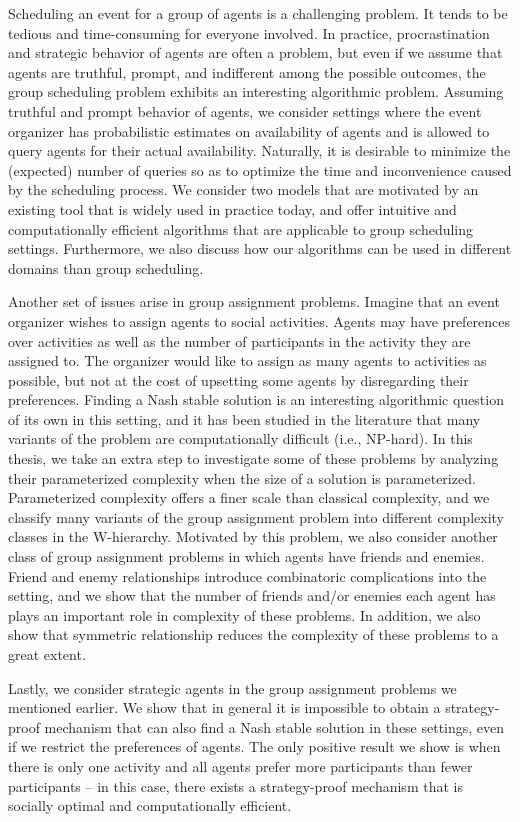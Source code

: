 Scheduling an event for a group of agents is a challenging problem. 
It tends to be tedious and time-consuming for everyone involved. 
In practice, procrastination and strategic behavior of agents are often a problem, but even if we assume that agents are truthful, prompt, and indifferent among the possible outcomes, the group scheduling problem exhibits an interesting algorithmic problem. Assuming truthful and prompt behavior of agents, we consider settings where the event organizer has probabilistic estimates on availability of agents and is allowed to query agents for their actual availability. Naturally, it is desirable to minimize the (expected) number of queries so as to optimize the time and inconvenience caused by the scheduling process. We consider two models that are motivated by an existing tool that is widely used in practice today, and offer intuitive and computationally efficient algorithms that are applicable to group scheduling settings. Furthermore, we also discuss how our algorithms can be used in different domains than group scheduling. 

Another set of issues arise in group assignment problems. Imagine that an event organizer wishes to assign agents to social activities. Agents may have preferences over activities as well as the number of participants in the activity they are assigned to. The organizer would like to assign as many agents to activities as possible, but not at the cost of upsetting some agents by disregarding their preferences. Finding a Nash stable solution is an interesting algorithmic question of its own in this setting, and it has been studied in the literature that many variants of the problem are computationally difficult (i.e., NP-hard). In this thesis, we take an extra step to investigate some of these problems by analyzing their parameterized complexity when the size of a solution is parameterized. Parameterized complexity offers a finer scale than classical complexity, and we classify many variants of the group assignment problem into different complexity classes in the W-hierarchy. Motivated by this problem, we also consider another class of group assignment problems in which agents have friends and enemies. Friend and enemy relationships introduce combinatoric complications into the setting, and we show that the number of friends and/or enemies each agent has plays an important role in complexity of these problems. In addition, we also show that symmetric relationship reduces the complexity of these problems to a great extent.

Lastly, we consider strategic agents in the group assignment problems we mentioned earlier. We show that in general it is impossible to obtain a strategy-proof mechanism that can also find a Nash stable solution in these settings, even if we restrict the preferences of agents. The only positive result we show is when there is only one activity and all agents prefer more participants than fewer participants -- in this case, there exists a strategy-proof mechanism that is socially optimal and computationally efficient. 